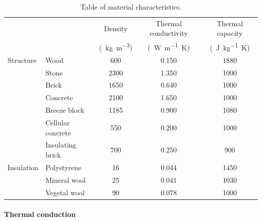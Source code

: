 \documentclass[11pt]{article}
\begin{document}
            \begin{table}[ht]
            \centering
            \caption{\label{tab:materials} Table of material characteristics.}
            \small
            \begin{tabular}{llccc}
                \toprule
                & & Density & Thermal conductivity & Thermal capacity \\
                & & (\SI{}{\kilo\gram\per\cubic\meter}) & (\SI{}{\watt\per\meter\kelvin}) & (\SI{}{\joule\per\kilo\gram\kelvin}) \\
                \midrule
                Structure & Wood & 600 & 0.150 & 1880 \\
                 & Stone & 2300 & 1.350 & 1000 \\
                 & Brick & 1650 & 0.640 & 1000 \\
                 & Concrete & 2100 & 1.650 & 1000 \\
                 & Breeze block & 1185 & 0.900 & 1080 \\
                 & Cellular concrete & 550 & 0.200 & 1000 \\
                 & Insulating brick & 700 & 0.250 & 900 \\
                \midrule
                Insulation & Polystyrene & 16 & 0.044 & 1450 \\
                 & Mineral wool & 25 & 0.041 & 1030 \\
                 & Vegetal wool & 90 & 0.078 & 1000 \\
                \bottomrule
                \end{tabular}
        \end{table}

            \paragraph{Thermal conduction}\mbox{}\\ %
            \label{par:thermal_conduction}
            
\end{document}
